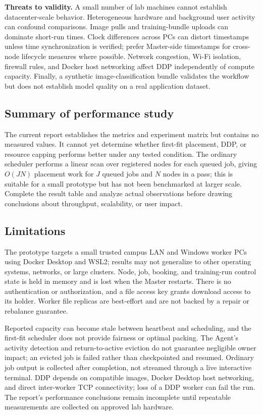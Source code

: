 \documentclass{article}
\begin{document}
\textbf{Threats to validity.} A small number of lab machines cannot establish datacenter-scale behavior. Heterogeneous hardware and background user activity can confound comparisons. Image pulls and training-bundle uploads can dominate short-run times. Clock differences across PCs can distort timestamps unless time synchronization is verified; prefer Master-side timestamps for cross-node lifecycle measures where possible. Network congestion, Wi-Fi isolation, firewall rules, and Docker host networking affect DDP independently of compute capacity. Finally, a synthetic image-classification bundle validates the workflow but does not establish model quality on a real application dataset.

	\subsection{Summary of performance study}

The current report establishes the metrics and experiment matrix but contains no measured values. It cannot yet determine whether first-fit placement, DDP, or resource capping performs better under any tested condition. The ordinary scheduler performs a linear scan over registered nodes for each queued job, giving \(O(JN)\) placement work for \(J\) queued jobs and \(N\) nodes in a pass; this is suitable for a small prototype but has not been benchmarked at larger scale. Complete the result table and analyze actual observations before drawing conclusions about throughput, scalability, or user impact.
    
    \subsection{Limitations}
The prototype targets a small trusted campus LAN and Windows worker PCs using Docker Desktop and WSL2; results may not generalize to other operating systems, networks, or large clusters. Node, job, booking, and training-run control state is held in memory and is lost when the Master restarts. There is no authentication or authorization, and a file access key grants download access to its holder. Worker file replicas are best-effort and are not backed by a repair or rebalance guarantee.

Reported capacity can become stale between heartbeat and scheduling, and the first-fit scheduler does not provide fairness or optimal packing. The Agent's activity detection and return-to-active eviction do not guarantee negligible owner impact; an evicted job is failed rather than checkpointed and resumed. Ordinary job output is collected after completion, not streamed through a live interactive terminal. DDP depends on compatible images, Docker Desktop host networking, and direct inter-worker TCP connectivity; loss of a DDP worker can fail the run. The report's performance conclusions remain incomplete until repeatable measurements are collected on approved lab hardware.
\end{document}
